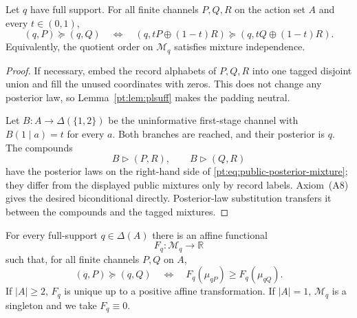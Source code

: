 \begin{lemma}\label{pt:lem:publiccoin}
Let $q$ have full support.  For all finite channels $P,Q,R$ on the action set
$A$ and every $t\in(0,1)$,
\[
 (q,P)\succeq(q,Q)
 \quad\Longleftrightarrow\quad
 (q,tP\oplus(1-t)R)
 \succeq
 (q,tQ\oplus(1-t)R).
\]
Equivalently, the quotient order on $\mathcal M_q$ satisfies mixture
independence.
\end{lemma}

\begin{proof}
If necessary, embed the record alphabets of $P,Q,R$ into one tagged disjoint
union and fill the unused coordinates with zeros.  This does not change any
posterior law, so Lemma~\ref{pt:lem:plsuff} makes the padding neutral.

Let $B:A\to\Delta(\{1,2\})$ be the uninformative first-stage channel with
$B(1\mid a)=t$ for every $a$.
Both branches are reached, and their posterior is $q$.  The compounds
\[
 B\triangleright(P,R),
 \qquad
 B\triangleright(Q,R)
\]
have the posterior laws on the right-hand side of
\eqref{pt:eq:public-posterior-mixture}; they differ from the displayed public
mixtures only by record labels.  Axiom~\textup{(A8)} gives the desired
biconditional directly.  Posterior-law substitution transfers it between the
compounds and the tagged mixtures.
\end{proof}

\begin{lemma}\label{pt:lem:postsep}
For every full-support $q\in\Delta(A)$ there is an affine functional
\[
 F_q:\mathcal M_q\longrightarrow\mathbb R
\]
such that, for all finite channels $P,Q$ on $A$,
\begin{equation}
 (q,P)\succeq(q,Q)
 \quad\Longleftrightarrow\quad
 F_q(\mu_{qP})\ge F_q(\mu_{qQ}).
 \label{pt:eq:fibre-representation}
\end{equation}
If $|A|\ge2$, $F_q$ is unique up to a positive affine transformation.  If
$|A|=1$, $\mathcal M_q$ is a singleton and we take $F_q\equiv0$.
\end{lemma}


